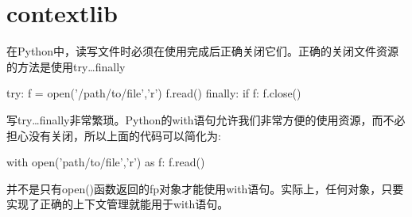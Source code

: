 \section{contextlib}
在Python中，读写文件时必须在使用完成后正确关闭它们。正确的关闭文件资源的方法是使用try\ldots finally
\begin{python}
try:
    f = open('/path/to/file','r')
    f.read()
finally:
    if f:
	f.close()
\end{python}
写try\ldots finally非常繁琐。Python的with语句允许我们非常方便的使用资源，而不必担心没有关闭，所以上面的代码可以简化为:
\begin{python}
with open('path/to/file','r') as f:
    f.read()
\end{python}
并不是只有open()函数返回的fp对象才能使用with语句。实际上，任何对象，只要实现了正确的上下文管理就能用于with语句。

